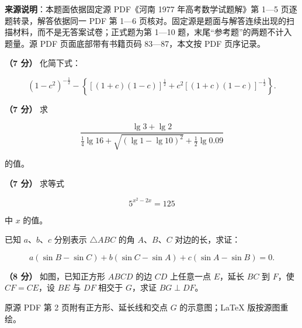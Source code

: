 


\begin{gktip}
\textbf{来源说明}：本题面依据固定源 PDF《河南 1977 年高考数学试题解》第 1—5 页逐题转录，解答依据同一 PDF 第 1—6 页核对。固定源是题面与解答连续出现的扫描材料，而不是无答案试卷；正式题为第 1—10 题，末尾“参考题”的两题不计入题量。源 PDF 页面底部带有书籍页码 83—87，本文按 PDF 页序记录。
\end{gktip}

\begin{question}
\textbf{（7 分）} 化简下式：

\nopagebreak[4]
\[
(1-c^2)^{-\frac12}
-\left\{[(1+c)(1-c)]^{\frac12}
+c^2[(1+c)(1-c)]^{-\frac12}\right\}.
\]

\end{question}
\begin{question}
\textbf{（7 分）} 求

\nopagebreak[4]
\[
\frac{\lg3+\lg2}
{\frac14\lg16+\sqrt{(\lg1-\lg10)^2}+\frac12\lg0.09}
\]

的值。

\end{question}
\begin{question}
\textbf{（7 分）} 求等式

\nopagebreak[4]
\[
5^{x^2-2x}=125
\]

中 $x$ 的值。

\end{question}
\begin{question}
已知 $a\text{、}b\text{、}c$ 分别表示 $\triangle ABC$ 的角 $A\text{、}B\text{、}C$ 对边的长，求证：

\nopagebreak[4]
\[
a(\sin B-\sin C)+b(\sin C-\sin A)+c(\sin A-\sin B)=0.
\]

\Needspace{0.4\textheight}
\end{question}
\begin{question}
\textbf{（8 分）} 如图，已知正方形 $ABCD$ 的边 $CD$ 上任意一点 $E$，延长 $BC$ 到 $F$，使 $CF=CE$，设 $BE$ 与 $DF$ 相交于 $G$，求证 $BG\perp DF$。

\begin{gktip}
原源 PDF 第 2 页附有正方形、延长线和交点 $G$ 的示意图；LaTeX 版按源图重绘。
\end{gktip}
\nopagebreak[4]
\begin{center}\end{center}
\nopagebreak[4]
\end{question}
